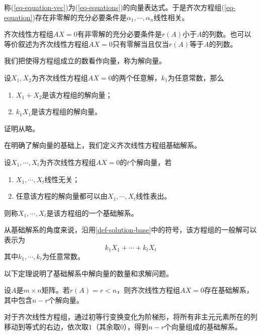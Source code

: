 称(\ref{eq-equation-vec})为(\ref{eq-equations})的向量表达式。于是齐次方程组(\ref{eq-equation})存在非零解的充分必要条件是$\alpha_1,\cdots,\alpha_n$线性相关。

\begin{thm}
    \label{thm-equation-nonzero-solve}
    齐次线性方程组$AX=0$有非零解的充分必要条件是$r(A)$小于$A$的列数。也可以等价叙述为齐次线性方程组$AX=0$只有零解当且仅当$r(A)$等于$A$的列数。
\end{thm}

我们把使得方程组成立的数看作向量，称为解向量。

\begin{property}
    \label{property-solution-vector}
    设$X_1,X_2$为齐次线性方程组$AX=0$的两个任意解，$k_1$为任意常数，那么
    \begin{enumerate}
        \item $X_1+X_2$是该方程组的解向量；
        \item $k_1X_1$是该方程组的解向量。
    \end{enumerate}
\end{property}

证明从略。

在明确了解向量的基础上，我们定义齐次线性方程组基础解系。

\begin{definition}
    \label{def-solution-base}
    设$X_1,\cdots,X_t$为齐次线性方程组$AX=0$的$t$个解向量，若
    \begin{enumerate}
        \item $X_1,\cdots,X_t$线性无关；
        \item 任意该方程的解向量都可以由$X_1,\cdots,X_t$线性表出。
    \end{enumerate}
    则称$X_1,\cdots,X_t$是该方程组的一个基础解系。
\end{definition}

从基础解系的角度来说，沿用\ref{def-solution-base}中的符号，该方程组的一般解可以表示为
\[
    k_1X_1+\cdots+k_tX_t
\]
其中$k_1,\cdots,k_t$为任意常数。

以下定理说明了基础解系中解向量的数量和求解问题。

\begin{thm}
    \label{thm-solution-base-calculation}
    设$A$是$m\times n$矩阵。若$r(A)=r<n$，则齐次线性方程组$AX=0$存在基础解系，其中包含$n-r$个解向量。
\end{thm}

对于齐次线性方程组，通过初等行变换变化为阶梯形，将所有非主元元素所在的列移动到等式的右边，依次取$1$（其余取$0$），得到$n-r$个向量组成的基础解系。

